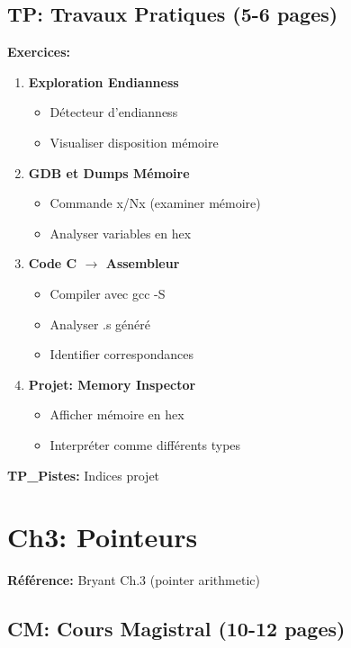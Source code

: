 \documentclass[10pt,a4paper]{article}
\begin{document}
\subsection*{TP: Travaux Pratiques (5-6 pages)}

\textbf{Exercices:}
\begin{enumerate}
\item \textbf{Exploration Endianness}
   \begin{itemize}
   \item Détecteur d'endianness
   \item Visualiser disposition mémoire
   \end{itemize}

\item \textbf{GDB et Dumps Mémoire}
   \begin{itemize}
   \item Commande x/Nx (examiner mémoire)
   \item Analyser variables en hex
   \end{itemize}

\item \textbf{Code C $\rightarrow$ Assembleur}
   \begin{itemize}
   \item Compiler avec gcc -S
   \item Analyser .s généré
   \item Identifier correspondances
   \end{itemize}

\item \textbf{Projet: Memory Inspector}
   \begin{itemize}
   \item Afficher mémoire en hex
   \item Interpréter comme différents types
   \end{itemize}
\end{enumerate}

\textbf{TP\_Pistes:} Indices projet

\newpage

\section{Ch3: Pointeurs}

\textbf{Référence:} Bryant Ch.3 (pointer arithmetic)

\subsection*{CM: Cours Magistral (10-12 pages)}
\end{document}
